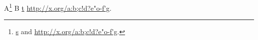 \documentclass{article}
\begin{document}
A\footnote{\href{http://x.org/a:b;c!d?e"o-f'g}{s} and \url{http://x.org/a:b;c!d?e"o-f'g}.}
B \href{http://x.org/a:b;c!d?e"o-f'g}{t} \url{http://x.org/a:b;c!d?e"o-f'g}.
\end{document}
